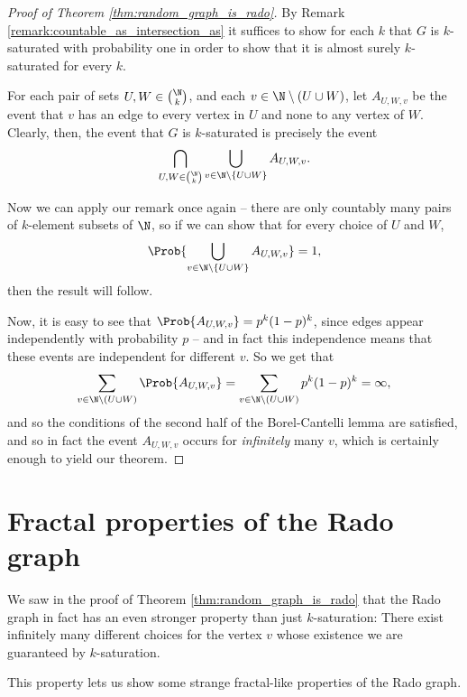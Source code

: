 \documentclass[nobib]{tufte-handout}
\begin{document}
\begin{proof}[Proof of Theorem \ref{thm:random_graph_is_rado}]
    By Remark \ref{remark:countable_as_intersection_as} it suffices to show for each $k$ that $G$ is $k$-saturated with probability one in order to show that it is almost surely $k$-saturated for every $k$.

    For each pair of sets $U, W \in \binom{\N}{k}$, and each $v \in \N \setminus (U \cup W)$, let $A_{U,W,v}$ be the event that $v$ has an edge to every vertex in $U$ and none to any vertex of $W$. Clearly, then, the event that $G$ is $k$-saturated is precisely the event
    $$\bigcap_{U, W \in \binom{\N}{k}} \bigcup_{v \in \N \setminus \{U \cup W\}} A_{U,W,v}.$$

    Now we can apply our remark once again -- there are only countably many pairs of $k$-element subsets of $\N$, so if we can show that for every choice of $U$ and $W$,
    $$\Prob{\bigcup_{v \in \N \setminus \{U \cup W\}} A_{U,W,v}} = 1,$$
    then the result will follow.

    Now, it is easy to see that $\Prob{A_{U,W,v}} = p^k(1-p)^k$, since edges appear independently with probability $p$ -- and in fact this independence means that these events are independent for different $v$. So we get that
    $$\sum_{v \in \N \setminus (U \cup W)} \Prob{A_{U,W,v}} = \sum_{v \in \N \setminus (U \cup W)} p^k(1-p)^k = \infty,$$
    and so the conditions of the second half of the Borel-Cantelli lemma are satisfied, and so in fact the event $A_{U,W,v}$ occurs for \emph{infinitely} many $v$, which is certainly enough to yield our theorem.
\end{proof}

\section{Fractal properties of the Rado graph}

\begin{remark}
    We saw in the proof of Theorem \ref{thm:random_graph_is_rado} that the Rado graph in fact has an even stronger property than just $k$-saturation: There exist infinitely many different choices for the vertex $v$ whose existence we are guaranteed by $k$-saturation.
\end{remark}

This property lets us show some strange fractal-like properties of the Rado graph.
\end{document}
